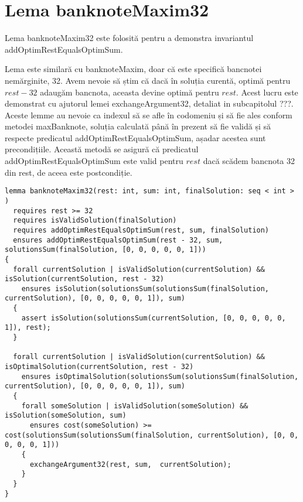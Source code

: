     \section{Lema banknoteMaxim32}
    Lema banknoteMaxim32 este folosită pentru a demonstra invariantul addOptimRestEqualsOptimSum.\par
    Lema este similară cu banknoteMaxim, doar că este specifică bancnotei nemărginite, 32.
    Avem nevoie să știm că dacă în soluția curentă, optimă pentru $ rest - 32$  
    adaugăm bancnota, aceasta devine optimă pentru $rest$. Acest lucru este demonstrat cu ajutorul 
    lemei exchangeArgument32, detaliat in subcapitolul   ???.
    Aceste lemme au nevoie ca indexul să se afle în codomeniu și să fie ales conform metodei maxBanknote, 
    soluția calculată până în prezent să fie validă și să respecte predicatul addOptimRestEqualsOptimSum, 
    așadar acestea sunt precondițiile.
    Această metodă se asigură că predicatul addOptimRestEqualsOptimSum este valid pentru $rest $ dacă scădem bancnota 32 din rest, 
    de aceea este postcondiție.

\begin{lstlisting}
lemma banknoteMaxim32(rest: int, sum: int, finalSolution: seq < int > )
  requires rest >= 32
  requires isValidSolution(finalSolution)
  requires addOptimRestEqualsOptimSum(rest, sum, finalSolution)
  ensures addOptimRestEqualsOptimSum(rest - 32, sum, solutionsSum(finalSolution, [0, 0, 0, 0, 0, 1])) 
{
  forall currentSolution | isValidSolution(currentSolution) && isSolution(currentSolution, rest - 32)
    ensures isSolution(solutionsSum(solutionsSum(finalSolution, currentSolution), [0, 0, 0, 0, 0, 1]), sum) 
  {
    assert isSolution(solutionsSum(currentSolution, [0, 0, 0, 0, 0, 1]), rest);
  }

  forall currentSolution | isValidSolution(currentSolution) && isOptimalSolution(currentSolution, rest - 32)
    ensures isOptimalSolution(solutionsSum(solutionsSum(finalSolution, currentSolution), [0, 0, 0, 0, 0, 1]), sum)
  {
    forall someSolution | isValidSolution(someSolution) && isSolution(someSolution, sum)
      ensures cost(someSolution) >= cost(solutionsSum(solutionsSum(finalSolution, currentSolution), [0, 0, 0, 0, 0, 1])) 
    {
      exchangeArgument32(rest, sum,  currentSolution);
    }
  }
}
\end{lstlisting}

